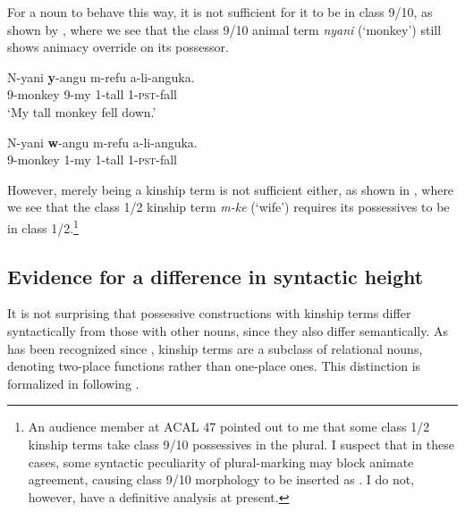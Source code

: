 \documentclass[output=paper,newtxmath,modfonts,nonflat,hidelinks]{langsci/langscibook}
\begin{document}
For a noun to behave this way, it is not sufficient for it to be in class 9/10, as shown by , where we see that the class 9/10 animal term \textit{nyani} (‘monkey’) still shows animacy override on its possessor.

\ea\label{ex:pesetsky:trastcon} 
\ea\label{ex:pesetsky:nyania}{ 
    \gll *N-yani \textbf{y}-angu m-refu a-li-anguka.  \\
       \textsc{9}-monkey \textsc{9}-my \textsc{1}-tall \textsc{1}-\textsc{pst}-fall  \\ 
        \glt `My tall monkey fell down.' } 
        
 \ex\label{ex:pesetsky:nyanib}{ \gll N-yani \textbf{w}-angu m-refu a-li-anguka. \\
\textsc{9}-monkey \textsc{1}-my \textsc{1}-tall \textsc{1}-\textsc{pst}-fall  \\ } \z \z


However, merely being a kinship term is not sufficient either, as shown in , where we see that the class 1/2 kinship term \textit{m-ke} (‘wife’) requires its possessives to be in class 1/2.\footnote{An audience member at ACAL 47 pointed out to me that some class 1/2 kinship terms take class 9/10 possessives in the plural.  I suspect that in these cases, some syntactic peculiarity of plural-marking may block animate agreement, causing class 9/10 morphology to be inserted as .  I do not, however, have a definitive analysis at present.}

\ea\label{ex:pesetsky:crastton} 
      
  \z \z



\subsection{Evidence for a difference in syntactic height}\label{sec:pesetsky:syntacticheight}

It is not surprising that possessive constructions with kinship terms differ syntactically from those with other nouns, since they also differ semantically.  As has been recognized since \citet{partee8397}, kinship terms are a subclass of relational nouns, denoting two-place functions rather than one-place ones. This distinction is formalized in  following \citet{barker95}.
\end{document}
